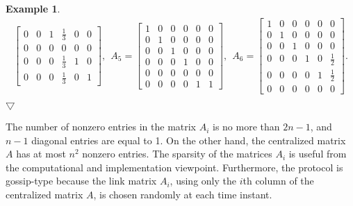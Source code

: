 \documentclass[11pt,draftcls,onecolumn]{IEEEtran}
\newtheorem{example}[theorem]{Example}
\newcommand{\field}[1]{{\mathbb{#1}}}
\newcommand{\End}{\hfill \mbox{$\bigtriangledown$}}
\newcommand{\E}{\field{E}}
\begin{document}
\begin{example}
\begin{align*}
\begin{bmatrix}
       0           &   0         & 1           &  \frac{1}{3} & 0 & 0\\
       0 & 0           & 0           & 0 & 0 & 0\\
       0           & 0           & 0           &  \frac{1}{3} & 1 & 0\\
       0           & 0           & 0           &  \frac{1}{3} & 0 & 1
     \end{bmatrix},~~
 A_5
   = \begin{bmatrix}
       1 &  0& 0           & 0 & 0 & 0\\
       0 & 1           &   0& 0 & 0 & 0\\
       0           &  0& 1 & 0 & 0 & 0\\
       0           & 0           & 0           &  1& 0 & 0 \\
       0           & 0           & 0           & 0 & 0 &  0\\
       0           & 0           & 0           & 0 & 1 &  1
     \end{bmatrix},~~
 A_6
   = \begin{bmatrix}
       1 & 0 & 0           & 0           & 0 & 0\\
       0 & 1           & 0 & 0           & 0 & 0\\
       0 & 0 & 1           & 0 & 0 & 0\\
       0 & 0           & 0 & 1 & 0 & \frac{1}{2}\\
       0 & 0           & 0           & 0           & 1 & \frac{1}{2}\\
       0 & 0           & 0 & 0           & 0 & 0
     \end{bmatrix}.
\end{align*}
\End
\end{example}

\medskip
The number of nonzero entries in the matrix $A_i$ is no more than $2n-1$, 
and $n-1$ diagonal entries are equal to 1. On the other hand, the centralized matrix $A$ 
has at most $n^2$ nonzero entries. The sparsity of the matrices $A_i$ is useful 
from the computational and implementation viewpoint.
Furthermore, the protocol is gossip-type because 
the link matrix $A_i$, using only the $i$th column of the centralized matrix $A$,
is chosen randomly at each time instant. 

\end{document}
